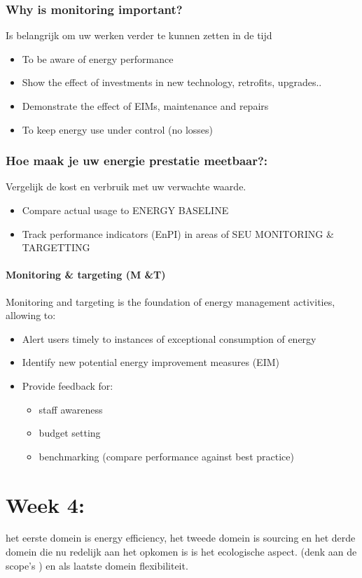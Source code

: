 \documentclass[12pt]{article}
\begin{document}
\subsubsection{Why is monitoring important?}
Is belangrijk om uw werken verder te kunnen zetten in de tijd
\begin{itemize}
    \item To be aware of energy performance 
    \item Show the effect of investments in new technology,
    retrofits, upgrades..
    \item Demonstrate the effect of EIMs, maintenance and repairs 
    \item To keep energy use under control (no losses)
\end{itemize}
\subsubsection{Hoe maak je uw energie prestatie meetbaar?:}
Vergelijk de kost en verbruik met uw verwachte waarde.\begin{itemize}
    \item Compare actual usage to ENERGY BASELINE
    \item Track performance indicators (EnPI) in areas of SEU
    MONITORING \& TARGETTING
\end{itemize}
\paragraph{Monitoring \& targeting (M \&T)}
Monitoring and targeting is the foundation of energy management activities, allowing to:\begin{itemize}
    \item Alert users timely to instances of exceptional consumption
    of energy 
    \item Identify new potential energy improvement measures
    (EIM) 
    \item Provide feedback for:\begin{itemize}
        \item staff awareness 
        \item budget setting 
        \item benchmarking (compare performance against best
        practice)
    \end{itemize}
\end{itemize}
\section{Week 4:}
het eerste domein is energy efficiency, het tweede domein is sourcing en het derde domein die nu redelijk aan het opkomen is is het ecologische aspect. (denk aan de scope's ) en als laatste domein flexibiliteit. 
\end{document}

